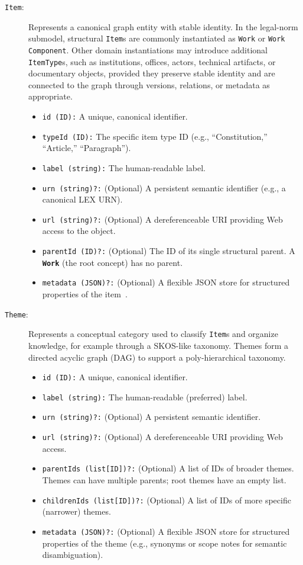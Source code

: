 \documentclass[11pt]{article}
\begin{document}
\begin{description}
    \item[\texttt{Item}:] Represents a canonical graph entity with stable identity. In the legal-norm submodel, structural \texttt{Item}s are commonly instantiated as \texttt{Work} or \texttt{Work Component}. Other domain instantiations may introduce additional \texttt{ItemType}s, such as institutions, offices, actors, technical artifacts, or documentary objects, provided they preserve stable identity and are connected to the graph through versions, relations, or metadata as appropriate.
    \begin{itemize}
        \item \texttt{id (ID):} A unique, canonical identifier.
        \item \texttt{typeId (ID):} The specific item type ID (e.g., ``Constitution,'' ``Article,'' ``Paragraph'').
        \item \texttt{label (string):} The human-readable label.
        \item \texttt{urn (string)?:} (Optional) A persistent semantic identifier (e.g., a canonical LEX URN).
        \item \texttt{url (string)?:} (Optional) A dereferenceable URI providing Web access to the object.
        \item \texttt{parentId (ID)?:} (Optional) The ID of its single structural parent. A \textbf{\texttt{Work}} (the root concept) has no parent.
        \item \texttt{metadata (JSON)?:} (Optional) A flexible JSON store for structured properties of the item~\cite{demartim2025structuredRepresentation}.
    \end{itemize}

    \item[\texttt{Theme}:] Represents a conceptual category used to classify \texttt{Item}s and organize knowledge, for example through a SKOS-like taxonomy. Themes form a directed acyclic graph (DAG) to support a poly-hierarchical taxonomy.
    \begin{itemize}
        \item \texttt{id (ID):} A unique, canonical identifier.
        \item \texttt{label (string):} The human-readable (preferred) label.
        \item \texttt{urn (string)?:} (Optional) A persistent semantic identifier.
        \item \texttt{url (string)?:} (Optional) A dereferenceable URI providing Web access.
        \item \texttt{parentIds (list[ID])?:} (Optional) A list of IDs of broader themes. Themes can have multiple parents; root themes have an empty list.
        \item \texttt{childrenIds (list[ID])?:} (Optional) A list of IDs of more specific (narrower) themes.
        \item \texttt{metadata (JSON)?:} (Optional) A flexible JSON store for structured properties of the theme (e.g., synonyms or scope notes for semantic disambiguation).
    \end{itemize}


\end{description}
\end{document}
